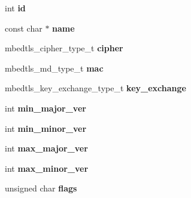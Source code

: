 \begin{DoxyCompactItemize}
\item 
\hypertarget{structmbedtls__ssl__ciphersuite__t_a04315a97cb3a0c4f2065131095af18f9}{int {\bfseries id}}\label{structmbedtls__ssl__ciphersuite__t_a04315a97cb3a0c4f2065131095af18f9}

\item 
\hypertarget{structmbedtls__ssl__ciphersuite__t_aa77bcf2ac4c95f819bd1fd3c60daf7c6}{const char $\ast$ {\bfseries name}}\label{structmbedtls__ssl__ciphersuite__t_aa77bcf2ac4c95f819bd1fd3c60daf7c6}

\item 
\hypertarget{structmbedtls__ssl__ciphersuite__t_ab700258b521262a10786ee820009d0bd}{mbedtls\-\_\-cipher\-\_\-type\-\_\-t {\bfseries cipher}}\label{structmbedtls__ssl__ciphersuite__t_ab700258b521262a10786ee820009d0bd}

\item 
\hypertarget{structmbedtls__ssl__ciphersuite__t_a4ff359e034af1dd11eee3af8ba90e33b}{mbedtls\-\_\-md\-\_\-type\-\_\-t {\bfseries mac}}\label{structmbedtls__ssl__ciphersuite__t_a4ff359e034af1dd11eee3af8ba90e33b}

\item 
\hypertarget{structmbedtls__ssl__ciphersuite__t_a4099ed119c2893364c2d3e1eba397106}{mbedtls\-\_\-key\-\_\-exchange\-\_\-type\-\_\-t {\bfseries key\-\_\-exchange}}\label{structmbedtls__ssl__ciphersuite__t_a4099ed119c2893364c2d3e1eba397106}

\item 
\hypertarget{structmbedtls__ssl__ciphersuite__t_a1a9b466f9fd946543595fc7edb47f3e7}{int {\bfseries min\-\_\-major\-\_\-ver}}\label{structmbedtls__ssl__ciphersuite__t_a1a9b466f9fd946543595fc7edb47f3e7}

\item 
\hypertarget{structmbedtls__ssl__ciphersuite__t_aee8ff3239d90fdca2edeb4f4aec3776e}{int {\bfseries min\-\_\-minor\-\_\-ver}}\label{structmbedtls__ssl__ciphersuite__t_aee8ff3239d90fdca2edeb4f4aec3776e}

\item 
\hypertarget{structmbedtls__ssl__ciphersuite__t_aa0c974d0a42ecdf41cc8a0f23276cd37}{int {\bfseries max\-\_\-major\-\_\-ver}}\label{structmbedtls__ssl__ciphersuite__t_aa0c974d0a42ecdf41cc8a0f23276cd37}

\item 
\hypertarget{structmbedtls__ssl__ciphersuite__t_a30838dbab879beba0059b2a56529177d}{int {\bfseries max\-\_\-minor\-\_\-ver}}\label{structmbedtls__ssl__ciphersuite__t_a30838dbab879beba0059b2a56529177d}

\item 
\hypertarget{structmbedtls__ssl__ciphersuite__t_a91c0ec15468b4cbb8f4f1c9861fe2456}{unsigned char {\bfseries flags}}\label{structmbedtls__ssl__ciphersuite__t_a91c0ec15468b4cbb8f4f1c9861fe2456}

\end{DoxyCompactItemize}


